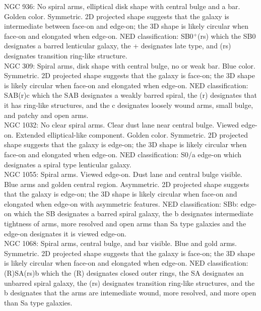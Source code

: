 \documentclass[10pt,letterpaper]{article}
\begin{document}
NGC 936: No spiral arms, elliptical disk shape with central bulge and a bar. Golden color. Symmetric. 2D projected shape suggests that the galaxy is intermediate between face-on and edge-on; the 3D shape is likely circular when face-on and elongated when edge-on. NED classification: SB0$^+$(rs) which the SB0 designates a barred lenticular galaxy, the + designates late type, and (rs) designates transition ring-like structure.\\

NGC 309: Spiral arms, disk shape with central bulge, no or weak bar. Blue color. Symmetric. 2D projected shape suggests that the galaxy is face-on; the 3D shape is likely circular when face-on and elongated when edge-on. NED classification: SAB(r)c which the SAB designates a weakly barred spiral, the (r) designates that it has ring-like structures, and the c designates loosely wound arms, small bulge, and patchy and open arms.\\

NGC 1032: No clear spiral arms. Clear dust lane near central bulge. Viewed edge-on. Extended elliptical-like component. Golden color. Symmetric. 2D projected shape suggests that the galaxy is edge-on; the 3D shape is likely circular when face-on and elongated when edge-on. NED classification: S0/a edge-on which designates a spiral type lenticular galaxy.\\

NGC 1055: Spiral arms. Viewed edge-on. Dust lane and central bulge visible. Blue arms and golden central region. Asymmetric. 2D projected shape suggests that the galaxy is edge-on; the 3D shape is likely circular when face-on and elongated when edge-on with asymmetric features. NED classification: SBb: edge-on which the SB designates a barred spiral galaxy, the b designates intermediate tightness of arms, more resolved and open arms than Sa type galaxies and the edge-on designates it is viewed edge-on.\\

NGC 1068: Spiral arms, central bulge, and bar visible. Blue and gold arms. Symmetric. 2D projected shape suggests that the galaxy is face-on; the 3D shape is likely circular when face-on and elongated when edge-on. NED classification: (R)SA(rs)b which the (R) designates closed outer rings, the SA designates an unbarred spiral galaxy, the (rs) designates transition ring-like structures, and the b designates that the arms are intemediate wound, more resolved, and more open than Sa type galaxies.\\
\end{document}
